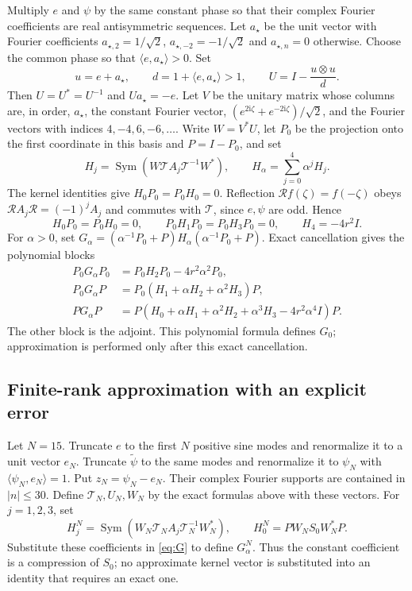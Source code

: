 \documentclass[a4paper,11pt]{article}
\numberwithin{equation}{section}
\theoremstyle{definition}
\theoremstyle{remark}
\newcommand{\ii}{\mathrm i}
\newcommand{\Sym}{\operatorname{Sym}}
\newcommand{\ip}[2]{\langle#1,#2\rangle}
\newcommand{\calT}{\mathcal T}
\newcommand{\calR}{\mathcal R}
\newcommand{\avec}{a_\star}
\begin{document}
Multiply $e$ and $\psi$ by the same constant phase so that their complex Fourier coefficients are real antisymmetric sequences. Let $\avec$ be the unit vector with Fourier coefficients $a_{\star,2}=1/\sqrt2$, $a_{\star,-2}=-1/\sqrt2$ and $a_{\star,n}=0$ otherwise. Choose the common phase so that $\ip e{\avec}>0$. Set
\begin{equation}\label{eq:householder}
 u=e+\avec,\qquad d=1+\ip e{\avec}>1,\qquad U=I-\frac{u\otimes u}{d}.
\end{equation}
Then $U=U^*=U^{-1}$ and $U\avec=-e$. Let $V$ be the unitary matrix whose columns are, in order, $\avec$, the constant Fourier vector, $(e^{2\ii\zeta}+e^{-2\ii\zeta})/\sqrt2$, and the Fourier vectors with indices $4,-4,6,-6,\ldots$. Write $W=V^*U$, let $P_0$ be the projection onto the first coordinate in this basis and $P=I-P_0$, and set
\[
 H_j=\Sym(W\calT A_j\calT^{-1}W^*),\qquad H_\alpha=\sum_{j=0}^4\alpha^jH_j.
\]
The kernel identities give $H_0P_0=P_0H_0=0$. Reflection $\calR f(\zeta)=f(-\zeta)$ obeys $\calR A_j\calR=(-1)^jA_j$ and commutes with $\calT$, since $e,\psi$ are odd. Hence
\begin{equation}\label{eq:exact-zeros}
 H_0P_0=P_0H_0=0,\qquad
 P_0H_1P_0=P_0H_3P_0=0,\qquad H_4=-4r^2I.
\end{equation}
For $\alpha>0$, set $G_\alpha=(\alpha^{-1}P_0+P)H_\alpha(\alpha^{-1}P_0+P)$. Exact cancellation gives the polynomial blocks
\begin{equation}\label{eq:G}
 \begin{aligned}
 P_0G_\alpha P_0&=P_0H_2P_0-4r^2\alpha^2P_0,\\
 P_0G_\alpha P&=P_0(H_1+\alpha H_2+\alpha^2H_3)P,\\
 PG_\alpha P&=P(H_0+\alpha H_1+\alpha^2H_2+\alpha^3H_3-4r^2\alpha^4I)P.
 \end{aligned}
\end{equation}
The other block is the adjoint. This polynomial formula defines $G_0$; approximation is performed only after this exact cancellation.



\subsection{Finite-rank approximation with an explicit error}
Let $N=15$. Truncate $e$ to the first $N$ positive sine modes and renormalize it to a unit vector $e_N$. Truncate $\widetilde\psi$ to the same modes and renormalize it to $\psi_N$ with $\ip{\psi_N}{e_N}=1$. Put $z_N=\psi_N-e_N$. Their complex Fourier supports are contained in $|n|\le30$. Define $\calT_N,U_N,W_N$ by the exact formulas above with these vectors. For $j=1,2,3$, set
\[
 H_j^N=\Sym(W_N\calT_N A_j\calT_N^{-1}W_N^*),\qquad
 H_0^N=PW_NS_0W_N^*P.
\]
Substitute these coefficients in \eqref{eq:G} to define $G_\alpha^N$. Thus the constant coefficient is a compression of $S_0$; no approximate kernel vector is substituted into an identity that requires an exact one.
\end{document}
